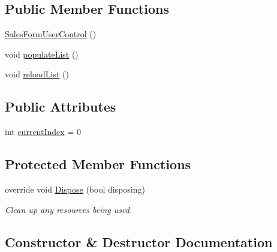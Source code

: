 \subsection*{Public Member Functions}
\begin{DoxyCompactItemize}
\item 
\hyperlink{class_health___assignment_1_1_sales_form_user_control_ab1d2ca98434c8e8e9e2b02d0c6e8b4da}{Sales\+Form\+User\+Control} ()
\item 
void \hyperlink{class_health___assignment_1_1_sales_form_user_control_a6e9c1eadc88065f57e28cac0af071baf}{populate\+List} ()
\item 
void \hyperlink{class_health___assignment_1_1_sales_form_user_control_ad156be675f6687f6840c56ddd39fe5a1}{reload\+List} ()
\end{DoxyCompactItemize}
\subsection*{Public Attributes}
\begin{DoxyCompactItemize}
\item 
int \hyperlink{class_health___assignment_1_1_sales_form_user_control_ac49df6be867963d6c5ddd6ebf806a834}{current\+Index} = 0
\end{DoxyCompactItemize}
\subsection*{Protected Member Functions}
\begin{DoxyCompactItemize}
\item 
override void \hyperlink{class_health___assignment_1_1_sales_form_user_control_ad7abd0df63b761c59fc3a3d07b20989b}{Dispose} (bool disposing)
\begin{DoxyCompactList}\small\item\em Clean up any resources being used. \end{DoxyCompactList}\end{DoxyCompactItemize}


\subsection{Constructor \& Destructor Documentation}
\mbox{\label{class_health___assignment_1_1_sales_form_user_control_ab1d2ca98434c8e8e9e2b02d0c6e8b4da}} 
